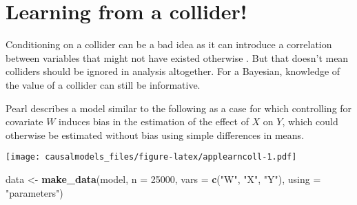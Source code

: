 \documentclass[
  12pt,
]{book}
\newenvironment{Shaded}{\begin{snugshade}}{\end{snugshade}}
\newcommand{\DataTypeTok}[1]{\textcolor[rgb]{0.13,0.29,0.53}{#1}}
\newcommand{\DecValTok}[1]{\textcolor[rgb]{0.00,0.00,0.81}{#1}}
\newcommand{\KeywordTok}[1]{\textcolor[rgb]{0.13,0.29,0.53}{\textbf{#1}}}
\newcommand{\NormalTok}[1]{#1}
\newcommand{\OperatorTok}[1]{\textcolor[rgb]{0.81,0.36,0.00}{\textbf{#1}}}
\newcommand{\OtherTok}[1]{\textcolor[rgb]{0.56,0.35,0.01}{#1}}
\newcommand{\StringTok}[1]{\textcolor[rgb]{0.31,0.60,0.02}{#1}}
\begin{document}
\hypertarget{learning-from-a-collider}{%
\section{Learning from a collider!}\label{learning-from-a-collider}}

Conditioning on a collider can be a bad idea as it can introduce a correlation between variables that might not have existed otherwise \citep{elwert2014endogenous}. But that doesn't mean colliders should be ignored in analysis altogether. For a Bayesian, knowledge of the value of a collider can still be informative.

Pearl describes a model similar to the following as a case for which controlling for covariate \(W\) induces bias in the estimation of the effect of \(X\) on \(Y\), which could otherwise be estimated without bias using simple differences in means.

\begin{Shaded}
\end{Shaded}

\texttt{[image: causalmodels\_files/figure-latex/applearncoll-1.pdf]}

\begin{Shaded}
\begin{Highlighting}[]
\NormalTok{data <-}\StringTok{ }\KeywordTok{make_data}\NormalTok{(model, }
                  \DataTypeTok{n =} \DecValTok{25000}\NormalTok{, }
                  \DataTypeTok{vars =} \KeywordTok{c}\NormalTok{(}\StringTok{"W"}\NormalTok{, }\StringTok{"X"}\NormalTok{, }\StringTok{"Y"}\NormalTok{), }
                  \DataTypeTok{using =} \StringTok{"parameters"}\NormalTok{)}
\end{Highlighting}
\end{Shaded}
\end{document}
